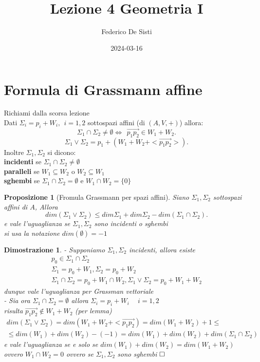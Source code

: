 \documentclass[12px]{article}
\title{Lezione 4 Geometria I}
\date{ 2024-03-16}
\author{Federico De Sisti}
\theoremstyle{break}
\theoremstyle{break}
\theoremstyle{break}
\theoremstyle{break}
\newtheorem{propo}{Proposizione}
\theoremstyle{break}
\newtheorem*{dimo}{Dimostrazione}
\theoremstyle{break}
\newenvironment{prop}
  {\begin{mdframed}\begin{propo}}
  {\end{propo}\end{mdframed}}
\begin{document}
\newpage
\section{Formula di Grassmann affine}
Richiami dalla scorsa lezione\\
Dati $\Sigma_i = p_i + W_i, \ \ i=1,2$ sottospazi affini (di $(A,V,+)$) allora: \\
\[\Sigma_1\cap\Sigma_2\neq\emptyset \Leftrightarrow \ \ \overrightarrow{p_1p_2}\in W_1 + W_2.\]
\[
	\Sigma_1\vee\Sigma_2 = p_1 + (W_1 + W_2 + <\overrightarrow{p_1p_2}>)
.\] 
Inoltre $\Sigma_1, \Sigma_2$ si dicono:\\
\textbf{incidenti} se $\Sigma_1\cap\Sigma_2\neq\emptyset$\\
\textbf{paralleli} se $W_1\subseteq W_2$ o $W_2\subseteq W_1$ \\
\textbf{sghembi} se $\Sigma_1\cap\Sigma_2 = \emptyset$ e $W_1\cap W_2 = \{0\}$
\begin{prop}[Fromula Grassmann per spazi affini]
	Siano $\Sigma_1, \Sigma_2 $ sottospazi affini di $A$, Allora 
	\[
	dim(\Sigma_1 \vee \Sigma_2) \leq dim\Sigma_1 + dim\Sigma_2 - dim(\Sigma_1\cap\Sigma_2)
	.\] 
	e vale l'uguaglianza se $\Sigma_1, \Sigma_2$ sono incidenti o sghembi\\
	si usa la notazione $dim(\emptyset) = -1$
\end{prop}
\begin{dimo}
	- Supponiamo $\Sigma_1,\Sigma_2$ incidenti, allora esiste
\begin{gather*}
	p_0 \in\Sigma_1\cap\Sigma_2 \\
	\Sigma_1 = p_0 + W_1, \Sigma_2 = p_0 + W_2\\
	\Sigma_1\cap\Sigma_2 = p_0 + W_1\cap W_2, \Sigma_1\vee\Sigma_2 = p_0 + W_1 + W_2
\end{gather*}
	dunque vale l'uguaglianza per Grassman vettoriale\\
	- Sia ora $\Sigma_1\cap\Sigma_2 = \emptyset$ allora $\Sigma_i = p_i + W_i$ ~ $i = 1, 2$\\
	risulta $\overrightarrow{p_1p_2}\notin W_1 + W_2$ (per lemma)\\
	\begin{gather*}
		dim(\Sigma_1\vee\Sigma_2) = dim(W_1 + W_2 + <\overrightarrow{p_1p_2}) = dim(W_1+W_2) + 1\leq \\ \leq dim(W_1) + dim(W_2) - (-1) = dim(W_1) + dim(W_2) + dim(\Sigma_1\cap\Sigma_2)
	\end{gather*}
	e vale l'uguaglianza se e solo se $dim(W_1) + dim(W_2) = dim(W_1 + W_2)$ ovvero $W_1\cap W_2 = {0}$ ovvero se $\Sigma_1, \Sigma_2$ sono sghembi $\hfill\square$	
\end{dimo}
\end{document}
